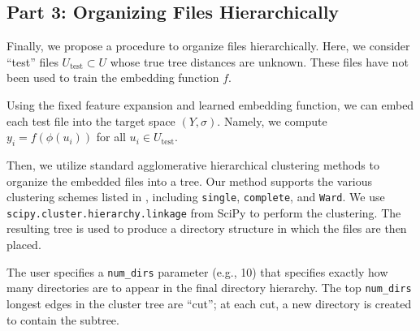\documentclass{article}
\begin{document}
\subsection{Part 3: Organizing Files Hierarchically}

Finally, we propose a procedure to organize files hierarchically. Here, we consider ``test'' files $U_\text{test} \subset U$ whose true tree distances are unknown. These files have not been used to train the embedding function $f$.

Using the fixed feature expansion and learned embedding function, we can embed each test file into the target space $(Y, \sigma)$. Namely, we compute $y_i = f(\phi(u_i))$ for all $u_i \in U_\text{test}$.

Then, we utilize standard agglomerative hierarchical clustering methods to organize the embedded files into a tree. Our method supports the various clustering schemes listed in \cite{müllner2011modernhierarchicalagglomerativeclustering}, including \texttt{single}, \texttt{complete}, and \texttt{Ward}. We use \texttt{scipy.cluster.hierarchy.linkage} from SciPy to perform the clustering. The resulting tree is used to produce a directory structure in which the files are then placed.

The user specifies a \texttt{num\_dirs} parameter (e.g., 10) that specifies exactly how many directories are to appear in the final directory hierarchy. The top \texttt{num\_dirs} longest edges in the cluster tree are ``cut''; at each cut, a new directory is created to contain the subtree.
\end{document}
